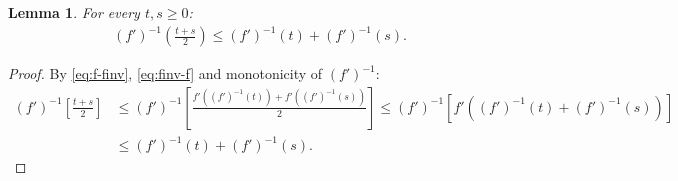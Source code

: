 \documentclass[10pt,a4paper]{amsart}
\newtheorem{lemma}{Lemma}
\begin{document}
\begin{lemma}
\label{lem:fprimeinvadd}
For every $t,s \ge 0$:
\begin{align*}
(f')^{-1}\left( \frac{t+s}{2} \right) \le (f')^{-1}(t) + (f')^{-1}(s).
\end{align*}
\end{lemma}

\begin{proof}
By \eqref{eq:f-finv}, \eqref{eq:finv-f} and monotonicity of $(f')^{-1} $:
\begin{align*}
(f')^{-1} \left[ \frac{t+s}{2} \right] &\le (f')^{-1} \left[ \frac{f'((f')^{-1}(t))+ f'((f')^{-1}(s))}{2} \right] \le (f')^{-1} \left[ f'\left((f')^{-1}(t)+(f')^{-1}(s)\right) \right]\\
&\le (f')^{-1}(t)+(f')^{-1}(s).
\end{align*}
\end{proof}
\end{document}
